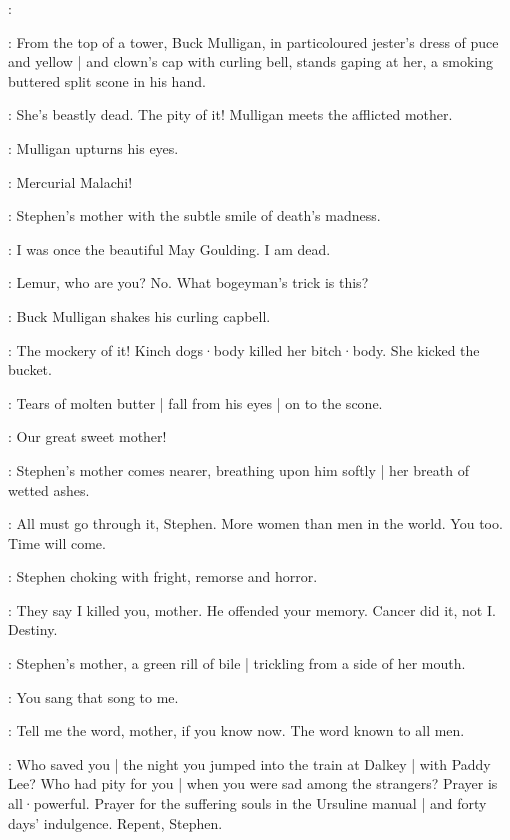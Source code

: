 \Choir:
\begin{verse}
\end{verse}

:
From the top of a tower,
Buck Mulligan,
in particoloured jester's dress of puce and yellow |
and clown's cap with curling bell,
stands gaping at her,
a smoking buttered split scone in his hand.

\BuckMulligan:
She's beastly dead.
The pity of it!
%
Mulligan meets the afflicted mother.

:
Mulligan upturns his eyes.

\BuckMulligan:
Mercurial Malachi!

:
Stephen's mother with the subtle smile of death's madness.

\Mother:
I was once the beautiful May Goulding.
I am dead.

\Stephen:
Lemur,
who are you?
No.
What bogeyman's trick is this?

:
Buck Mulligan shakes his curling capbell.

\BuckMulligan:
The mockery of it!
Kinch dogs·body killed her bitch·body.
She kicked the bucket.

:
Tears of molten butter |
fall from his eyes |
on to the scone.

\BuckMulligan:
Our great sweet mother!
%

:
Stephen's mother comes nearer,
breathing upon him softly |
her breath of wetted ashes.

\Mother:
All must go through it,
Stephen.
More women than men in the world.
You too.
Time will come.

:
Stephen choking with fright,
remorse and horror.

\Stephen:
They say I killed you,
mother.
He offended your memory.
Cancer did it,
not I\@.
Destiny.

:
Stephen's mother,
a green rill of bile |
trickling from a side of her mouth.

\Mother:
You sang that song to me.
%

\Stephen:
Tell me the word,
mother,
if you know now.
The word known to all men.

\Mother:
Who saved you |
the night you jumped into the train at Dalkey |
with Paddy Lee?
Who had pity for you |
when you were sad among the strangers?
Prayer is all·powerful.
Prayer for the suffering souls in the Ursuline manual |
and forty days' indulgence.
Repent,
Stephen.

